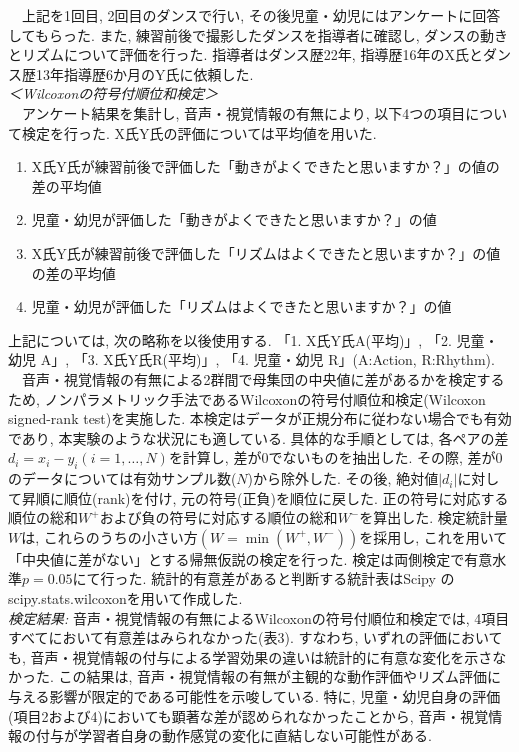 \documentclass[technicalreport]{ieicej}
\begin{document}
　上記を1回目, 2回目のダンスで行い, その後児童・幼児にはアンケートに回答してもらった. また, 練習前後で撮影したダンスを指導者に確認し, ダンスの動きとリズムについて評価を行った. 指導者はダンス歴22年, 指導歴16年のX氏とダンス歴13年指導歴6か月のY氏に依頼した. \\
\textit{＜Wilcoxonの符号付順位和検定＞}\\
　アンケート結果を集計し, 音声・視覚情報の有無により, 以下4つの項目について検定を行った. X氏Y氏の評価については平均値を用いた. 
\begin{enumerate}[label=\arabic*., nosep]
  \item X氏Y氏が練習前後で評価した「動きがよくできたと思いますか？」の値の差の平均値
  \item 児童・幼児が評価した「動きがよくできたと思いますか？」の値
  \item X氏Y氏が練習前後で評価した「リズムはよくできたと思いますか？」の値の差の平均値
  \item 児童・幼児が評価した「リズムはよくできたと思いますか？」の値
\end{enumerate}
上記については, 次の略称を以後使用する. 「1. X氏Y氏A(平均)」, 「2. 児童・幼児 A」, 「3. X氏Y氏R(平均)」, 「4. 児童・幼児 R」(A:Action, R:Rhythm). \\
　音声・視覚情報の有無による2群間で母集団の中央値に差があるかを検定するため, ノンパラメトリック手法であるWilcoxonの符号付順位和検定(Wilcoxon signed-rank test)を実施した. 本検定はデータが正規分布に従わない場合でも有効であり, 本実験のような状況にも適している. 具体的な手順としては, 各ペアの差$d_{i}=x_{i}-y_{i} (i=1,\dots,N)$を計算し, 差が0でないものを抽出した. その際, 差が0のデータについては有効サンプル数($N$)から除外した. その後, 絶対値$|d_{i}|$に対して昇順に順位(rank)を付け, 元の符号(正負)を順位に戻した. 正の符号に対応する順位の総和$W^+$および負の符号に対応する順位の総和$W^-$を算出した. 検定統計量$W$は, これらのうちの小さい方$(W=\min(W^+,W^-))$を採用し, これを用いて「中央値に差がない」とする帰無仮説の検定を行った. 検定は両側検定で有意水準$p=0.05$にて行った. 統計的有意差があると判断する統計表はScipy \cite{ref27}のscipy.stats.wilcoxonを用いて作成した. \\
\emph{検定結果: }音声・視覚情報の有無によるWilcoxonの符号付順位和検定では, 4項目すべてにおいて有意差はみられなかった(表3). すなわち, いずれの評価においても, 音声・視覚情報の付与による学習効果の違いは統計的に有意な変化を示さなかった. この結果は, 音声・視覚情報の有無が主観的な動作評価やリズム評価に与える影響が限定的である可能性を示唆している. 特に, 児童・幼児自身の評価(項目2および4)においても顕著な差が認められなかったことから, 音声・視覚情報の付与が学習者自身の動作感覚の変化に直結しない可能性がある. \\
\end{document}
